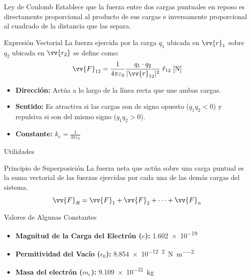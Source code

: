 \documentclass[10pt, aspectratio=169]{beamer}
\begin{document}
\begin{frame}{Ley de Coulomb}
    Establece que la fuerza entre dos cargas puntuales en reposo es directamente proporcional al producto de sus cargas e inversamente proporcional al cuadrado de la distancia que las separa.
    \begin{boxTeoria}{Expresión Vectorial}
        La fuerza ejercida por la carga $q_1$ ubicada en $\vv{r}_1$ sobre $q_2$ ubicada en $\vv{r_2}$ se define como:
        \begin{equation*}
            \vv{F}_{12} = \frac{1}{4\pi\varepsilon_0} \frac{q_1\cdot q_2}{|\vv{r}_{12}|^2} \;\hat{r}_{12} \;[\unit{\N}]
        \end{equation*}
    \end{boxTeoria}

    \begin{itemize}
        \item \textbf{Dirección:} Actúa a lo largo de la línea recta que une ambas cargas.
        \item \textbf{Sentido:} Es atractiva si las cargas son de signo opuesto ($q_1 q_2 < 0$) y repulsiva si son del mismo signo ($q_1 q_2 > 0$).
        \item \textbf{Constante:} $k_e = \frac{1}{4\pi\varepsilon_0}$
    \end{itemize}
\end{frame}

\begin{frame}{Utilidades}
    \vspace{-15pt}
    \begin{boxTeoria}{Principio de Superposición}
        La fuerza neta que actúa sobre una carga puntual es la suma vectorial de las fuerzas ejercidas por cada una de las demás cargas del sistema.
        \begin{equation*}
            \vv{F}_{R} = \vv{F}_{1} + \vv{F}_{2} + \dots + \vv{F}_{n}
        \end{equation*}
    \end{boxTeoria}

    \begin{boxNota}{Valores de Algunas Constantes}
        \begin{itemize}
            \item \textbf{Magnitud de la Carga del Electrón ($e$):} \qty{1.602e-19}{\C}
            \item \textbf{Permitividad del Vacío ($\epsilon_0$):} \qty{8.854e-12}{\C\squared\per\N\per\meter\squared}
            \item \textbf{Masa del electrón ($m_e$):} \qty{9.109e-31}{\kg}
        \end{itemize}
    \end{boxNota}

\end{frame}
\end{document}
